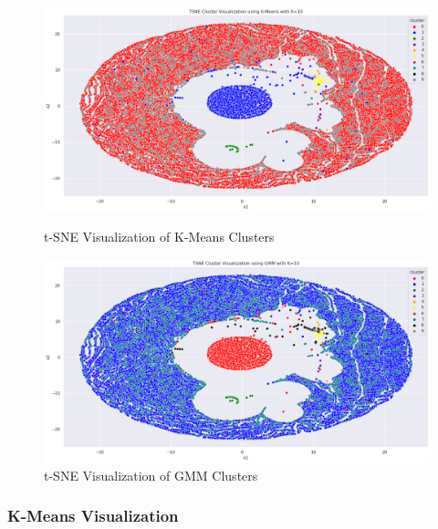         \begin{figure}[h]
            \centering
            \begin{minipage}[c]{0.47\textwidth}
                \centering
                \includegraphics[width=\textwidth]{../figures/plots/section3/tsne_kmeans_clusters.png}
                \caption{t-SNE Visualization of K-Means Clusters}
                \label{fig:tsne_kmeans}
            \end{minipage}
            \hfill
            \begin{minipage}[c]{0.47\textwidth}
                \centering
                \includegraphics[width=\textwidth]{../figures/plots/section3/tsne_gmm_clusters.png}
                \caption{t-SNE Visualization of GMM Clusters}
                \label{fig:tsne_gmm}
            \end{minipage}
        \end{figure}

        \subsubsection{K-Means Visualization \\}

